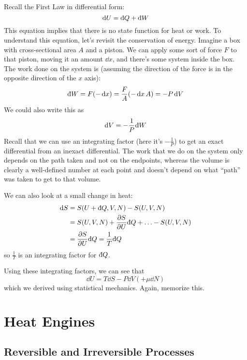 \documentclass[a4paper,twoside,master.tex]{subfiles}
\begin{document}

Recall the First Law in differential form:
\begin{equation}
    \dd{U} = \dbar{Q} + \dbar{W}
\end{equation}
This equation implies that there is no state function for heat or work. To understand this equation, let's revisit the conservation of energy. Imagine a box with cross-sectional area $ A $ and a piston. We can apply some sort of force $ F $ to that piston, moving it an amount $ \dd{x} $, and there's some system inside the box. The work done on the system is (assuming the direction of the force is in the opposite direction of the $ x $ axis):
\begin{equation}
    \dbar{W} = F (-\dd{x}) = \frac{F}{A} (- \dd{x} A) = - P \dd{V}
\end{equation}
We could also write this as
\begin{equation}
    \dd{V} = - \frac{1}{P} \dbar{W}
\end{equation}
Recall that we can use an integrating factor (here it's $ - \frac{1}{P} $) to get an exact differential from an inexact differential. The work that we do on the system only depends on the path taken and not on the endpoints, whereas the volume is clearly a well-defined number at each point and doesn't depend on what ``path'' was taken to get to that volume.

We can also look at a small change in heat:
\begin{align}
    \dd{S} &= S(U + \dbar{Q}, V, N) - S(U,V,N) \\
    &= S(U,V,N) + \pdv{S}{U} \dbar{Q} + \ldots - S(U,V,N) \\
    &= \pdv{S}{U} \dbar{Q} = \frac{1}{T} \dbar{Q}
\end{align}
so $ \frac{1}{T} $ is an integrating factor for $ \dbar{Q} $.

Using these integrating factors, we can see that
\begin{equation}
    \dd{U} = T \dd{S} - P \dd{V} \left( + \mu \dd{N} \right)
\end{equation}
which we derived using statistical mechanics. Again, memorize this.

\section{Heat Engines}
\label{sec:heat_engines}

\subsection{Reversible and Irreversible Processes}
\label{sub:reversible_and_irreversible_processes}
\end{document}

